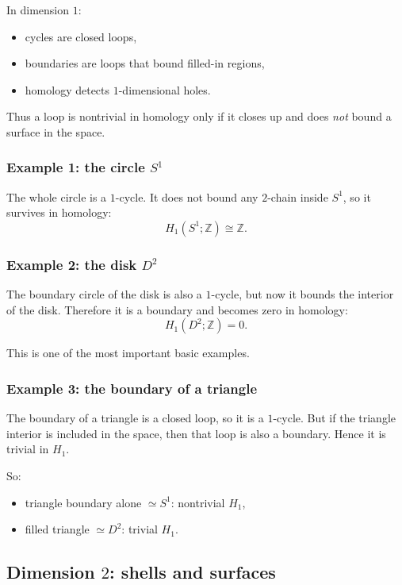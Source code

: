 \documentclass[12pt,a4paper]{article}
\newcommand{\Z}{\mathbb{Z}}
\theoremstyle{notespace}
\begin{document}
In dimension \(1\):
\begin{itemize}
	\item cycles are closed loops,
	\item boundaries are loops that bound filled-in regions,
	\item homology detects \(1\)-dimensional holes.
\end{itemize}

Thus a loop is nontrivial in homology only if it closes up and does \emph{not} bound a surface in the space.

\subsubsection*{Example 1: the circle \(S^1\)}

The whole circle is a \(1\)-cycle. It does not bound any \(2\)-chain inside \(S^1\), so it survives in homology:
\[
H_1(S^1;\Z)\cong \Z.
\]

\subsubsection*{Example 2: the disk \(D^2\)}

The boundary circle of the disk is also a \(1\)-cycle, but now it bounds the interior of the disk. Therefore it is a boundary and becomes zero in homology:
\[
H_1(D^2;\Z)=0.
\]

This is one of the most important basic examples.

\subsubsection*{Example 3: the boundary of a triangle}

The boundary of a triangle is a closed loop, so it is a \(1\)-cycle. But if the triangle interior is included in the space, then that loop is also a boundary. Hence it is trivial in \(H_1\).

So:
\begin{itemize}
	\item triangle boundary alone \(\simeq S^1\): nontrivial \(H_1\),
	\item filled triangle \(\simeq D^2\): trivial \(H_1\).
\end{itemize}

\subsection{Dimension \(2\): shells and surfaces}
\end{document}
